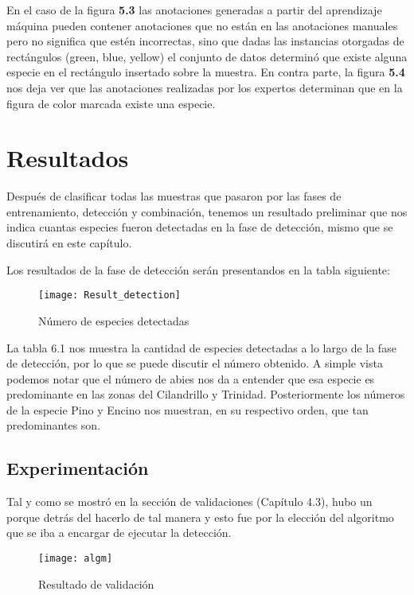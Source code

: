 En el caso de la figura \textbf{5.3} las anotaciones generadas a partir del aprendizaje máquina pueden contener anotaciones que no están en las anotaciones manuales pero no significa que estén incorrectas, sino que dadas las instancias otorgadas de rectángulos (green, blue, yellow) el conjunto de datos determinó que existe alguna especie en el rectángulo insertado sobre la muestra. En contra parte, la figura \textbf{5.4} nos deja ver que las anotaciones realizadas por los expertos determinan que en la figura de color marcada existe una especie.

\break

\chapter{Resultados}
Después de clasificar todas las muestras que pasaron por las fases de entrenamiento, detección y combinación, tenemos un resultado preliminar que nos indica cuantas especies fueron detectadas en la fase de detección, mismo que se discutirá en este capítulo.


Los resultados de la fase de detección serán presentandos en la tabla siguiente:

\begin{figure}[H]
  \centering
  \begin{minipage}[b]{0.5\textwidth}
        \texttt{[image: Result\_detection]}
    \caption{Número de especies detectadas}
  \end{minipage}
\end{figure}

La tabla 6.1 nos muestra la cantidad de especies detectadas a lo largo de la fase de detección, por lo que se puede discutir el número obtenido. A simple vista podemos notar que el número de abies nos da a entender que esa especie es predominante en las zonas del Cilandrillo y Trinidad. Posteriormente los números de la especie Pino y Encino nos muestran, en su respectivo orden, que tan predominantes son.

\section{Experimentación}
Tal y como se mostró en la sección de validaciones (Capítulo 4.3), hubo un porque detrás del hacerlo de tal manera y esto fue por la elección del algoritmo que se iba a encargar de ejecutar la detección.


\begin{figure}[H]
  \centering
  \begin{minipage}[b]{0.8\textwidth}
        \texttt{[image: algm]}
    \caption{Resultado de validación}
  \end{minipage}
\end{figure}


